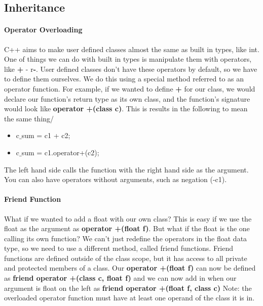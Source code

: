 \subsection{Inheritance}
\paragraph{Operator Overloading} C++ aims to make user defined classes almost the same as built in types, like int. One of things we can do with built in types is manipulate them with operators, like \textbf{+} - r\textbf{-}. User defined classes don't have these operators by default, so we have to define them ourselves. We do this using a special method referred to as an operator function. For example, if we wanted to define \textbf{+} for our class, we would declare our function's return type as its own class, and the function's signature would look like \textbf{operator +(class c)}. This is results in the following to mean the same thing/
\begin{itemize}
	\item c$\_$sum = c1 + c2;
	\item c$\_$sum = c1.operator+(c2);
\end{itemize} 
The left hand side calls the function with the right hand side as the argument. You can also have operators without arguments, such as negation (-c1).
\paragraph{Friend Function} What if we wanted to add a float with our own class? This is easy if we use the float as the argument as \textbf{operator +(float f)}. But what if the float is the one calling its own function? We can't just redefine the operators in the float data type, so we need to use a different method, called friend functions. Friend functions are defined outside of the class scope, but it has access to all private and protected members of a class. Our \textbf{operator +(float f)} can now be defined as \textbf{friend operator +(class c, float f)} and we can now add in when our argument is float on the left as \textbf{friend operator +(float f, class c)} Note: the overloaded operator function must have at least one operand of the class it is in.
